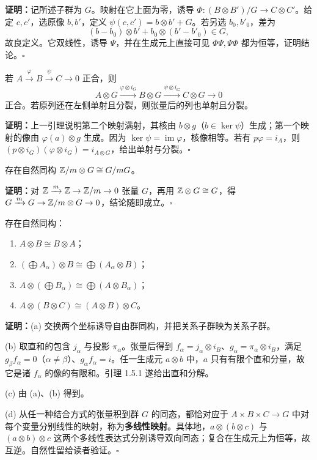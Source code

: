 \textbf{证明：}记所述子群为 $G$。映射在它上面为零，诱导 $\Phi:(B\otimes B')/G\to C\otimes C'$。给定 $c,c'$，选原像 $b,b'$，定义 $\psi(c,c')=b\otimes b'+G$。若另选 $b_0,b'_0$，差为
\[
(b-b_0)\otimes b'+b_0\otimes(b'-b'_0)\in G,
\]
故良定义。它双线性，诱导 $\Psi$，并在生成元上直接可见 $\Phi\Psi,\Psi\Phi$ 都为恒等，证明结论。\hfill$\square$

若 $A\xrightarrow{\varphi}B\xrightarrow{\psi}C\to0$ 正合，则
\[
A\otimes G\xrightarrow{\varphi\otimes i_G}B\otimes G\xrightarrow{\psi\otimes i_G}C\otimes G\to0
\]
正合。若原列还在左侧单射且分裂，则张量后的列也单射且分裂。

\textbf{证明：}上一引理说明第二个映射满射，其核由 $b\otimes g$（$b\in\ker\psi$）生成；第一个映射的像由 $\varphi(a)\otimes g$ 生成。因为 $\ker\psi=\operatorname{im}\varphi$，核像相等。若有 $p\varphi=i_A$，则 $(p\otimes i_G)(\varphi\otimes i_G)=i_{A\otimes G}$，给出单射与分裂。\hfill$\square$

存在自然同构 $\mathbb{Z}/m\otimes G\cong G/mG$。

\textbf{证明：}对 $\mathbb{Z}\xrightarrow{m}\mathbb{Z}\to\mathbb{Z}/m\to0$ 张量 $G$，再用 $\mathbb{Z}\otimes G\cong G$，得 $G\xrightarrow{m}G\to\mathbb{Z}/m\otimes G\to0$，结论随即成立。\hfill$\square$

存在自然同构：
\begin{enumerate}[label=(\alph*)]
\item $A\otimes B\cong B\otimes A$；
\item $(\bigoplus A_\alpha)\otimes B\cong\bigoplus(A_\alpha\otimes B)$；
\item $A\otimes(\bigoplus B_\alpha)\cong\bigoplus(A\otimes B_\alpha)$；
\item $A\otimes(B\otimes C)\cong(A\otimes B)\otimes C$。
\end{enumerate}
\textbf{证明：}(a) 交换两个坐标诱导自由群同构，并把关系子群映为关系子群。

(b) 取直和的包含 $j_\alpha$ 与投影 $\pi_\alpha$。张量后得到 $f_\alpha=j_\alpha\otimes i_B$、$g_\alpha=\pi_\alpha\otimes i_B$，满足 $g_\beta f_\alpha=0$（$\alpha\ne\beta$）、$g_\alpha f_\alpha=i$。任一生成元 $a\otimes b$ 中，$a$ 只有有限个直和分量，故它是诸 $f_\alpha$ 的像的有限和。引理 1.5.1 遂给出直和分解。

(c) 由 (a)、(b) 得到。

(d) 从任一种结合方式的张量积到群 $G$ 的同态，都恰对应于 $A\times B\times C\to G$ 中对每个变量分别线性的映射，称为\textbf{多线性映射}。具体地，$a\otimes(b\otimes c)$ 与 $(a\otimes b)\otimes c$ 这两个多线性表达式分别诱导双向同态；复合在生成元上为恒等，故互逆。自然性留给读者验证。\hfill$\square$

